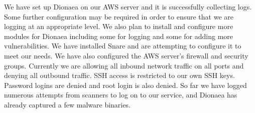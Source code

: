 We have set up Dionaea on our AWS server and it is successfully collecting logs. Some further configuration may be required in order to ensure that we are logging at an appropriate level. We also plan to install and configure more modules for Dionaea including some for logging and some for adding more vulnerabilities. We have installed Snare and are attempting to configure it to meet our needs. We have also configured the AWS server's firewall and security groups. Currently we are allowing all inbound network traffic on all ports and denying all outbound traffic. SSH access is restricted to our own SSH keys. Password logins are denied and root login is also denied. So far we have logged numerous attempts from scanners to log on to our service, and Dionaea has already captured a few malware binaries. 
